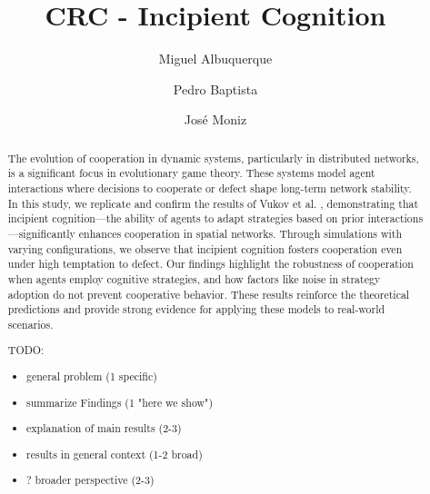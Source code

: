 \documentclass[runningheads]{llncs}
\begin{document}
%
\title{CRC - Incipient Cognition}


%
%
\author{Miguel Albuquerque \and
Pedro Baptista \and José Moniz}


%
\maketitle              %
%



\begin{abstract}
The evolution of cooperation in dynamic systems, particularly in distributed networks,
is a significant focus in evolutionary game theory. These systems model agent
interactions where decisions to cooperate or defect shape long-term network stability.
In this study, we replicate and confirm the results of Vukov et al. \cite{vukov},
demonstrating that incipient cognition—the ability of agents to adapt
strategies based on prior interactions—significantly enhances cooperation in spatial networks.
Through simulations with varying configurations, we observe that incipient cognition fosters
cooperation even under high temptation to defect. Our findings highlight the
robustness of cooperation when agents employ cognitive strategies, and how factors
like noise in strategy adoption do not prevent cooperative behavior.
These results reinforce the theoretical predictions and provide strong evidence
for applying these models to real-world scenarios.

TODO:
\begin{itemize}
    \item general problem (1 specific)
    \item summarize Findings (1 "here we show")
    \item explanation of main results (2-3)
    \item results in general context (1-2 broad)
    \item ? broader perspective (2-3)
\end{itemize}

\end{abstract}
\end{document}
